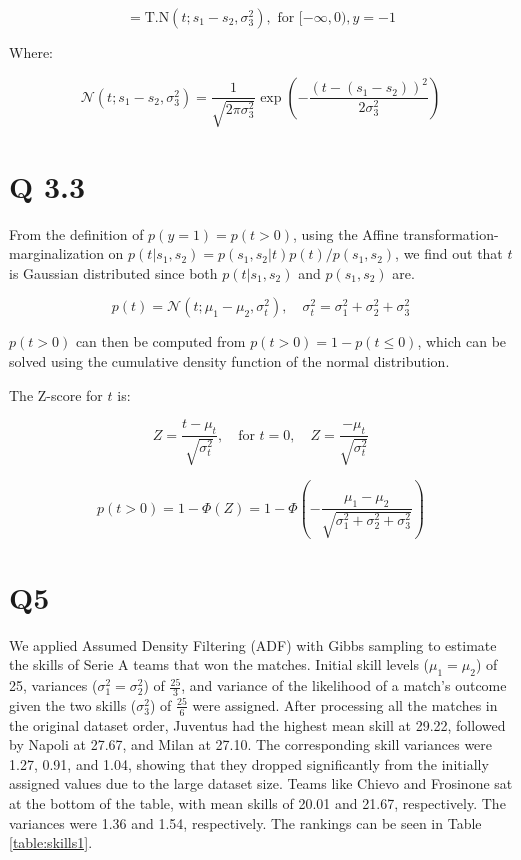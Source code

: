 \[
= \text{T.N}\left(t; s_1 - s_2, \sigma_3^2\right), \text{ for } [-\infty, 0), y = -1
\]

Where:

\[
\mathcal{N}\left(t; s_1 - s_2, \sigma_3^2\right) = \frac{1}{\sqrt{2\pi\sigma_3^2}} \exp\left( -\frac{(t - (s_1 - s_2))^2}{2\sigma_3^2} \right)
\]

\section*{Q 3.3}
From the definition of $p(y = 1) = p(t > 0)$, using the Affine transformation-marginalization on $p(t|s_1, s_2) = p(s_1, s_2|t) p(t) / p(s_1, s_2)$, we find out that $t$ is Gaussian distributed since both $p(t|s_1, s_2)$ and $p(s_1, s_2)$ are.

\[
p(t) = \mathcal{N}(t; \mu_1 - \mu_2, \sigma_t^2), \quad \sigma_t^2 = \sigma_1^2 + \sigma_2^2 + \sigma_3^2
\]

$p(t > 0)$ can then be computed from $p(t > 0) = 1 - p(t \leq 0)$, which can be solved using the cumulative density function of the normal distribution.

The Z-score for $t$ is:

\[
Z = \frac{t - \mu_t}{\sqrt{\sigma_t^2}}, \quad \text{for } t = 0, \quad Z = \frac{-\mu_t}{\sqrt{\sigma_t^2}}
\]

\[
p(t > 0) = 1 - \Phi(Z) = 1 - \Phi\left( -\frac{\mu_1 - \mu_2}{\sqrt{\sigma_1^2 + \sigma_2^2 + \sigma_3^2}} \right)
\]

\section*{Q5}
We applied Assumed Density Filtering (ADF) with Gibbs sampling to estimate the skills of Serie A teams that won the matches. Initial skill levels ($\mu_1 = \mu_2$) of 25, variances ($\sigma_1^2 = \sigma_2^2$) of $\frac{25}{3}$, and variance of the likelihood of a match's outcome given the two skills ($\sigma_3^2$) of $\frac{25}{6}$ were assigned. After processing all the matches in the original dataset order, Juventus had the highest mean skill at 29.22, followed by Napoli at 27.67, and Milan at 27.10. The corresponding skill variances were 1.27, 0.91, and 1.04, showing that they dropped significantly from the initially assigned values due to the large dataset size. Teams like Chievo and Frosinone sat at the bottom of the table, with mean skills of 20.01 and 21.67, respectively. The variances were 1.36 and 1.54, respectively. The rankings can be seen in Table \ref{table:skills1}.

